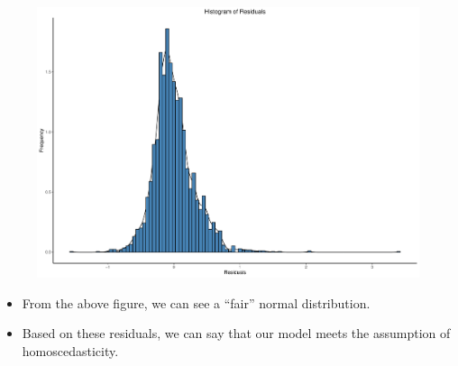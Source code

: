 \documentclass[a4paper]{article}
\begin{document}
\begin{figure}[H]
    \centering
    \includegraphics[keepaspectratio, width=1\textwidth, height=1\textheight]{LRM/Rplot10.pdf}
\end{figure}


\begin{itemize}
    \item From the above figure, we can see a “fair” normal distribution.
    \item Based on these residuals, we can say that our model meets the assumption of homoscedasticity.
\end{itemize}
\end{document}
